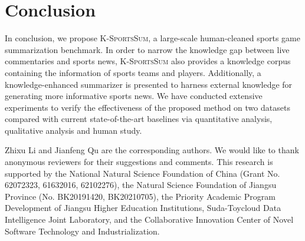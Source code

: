   
  
\section{Conclusion}
In conclusion, we propose \textsc{K-SportsSum}, a large-scale human-cleaned sports game summarization benchmark. In order to narrow the knowledge gap between live commentaries and sports news, \textsc{K-SportsSum} also provides a knowledge corpus containing the information of sports teams and players. Additionally, a  knowledge-enhanced summarizer is presented to harness external knowledge for generating more informative sports news. We have conducted extensive experiments to verify the effectiveness of the proposed method on two datasets compared with current state-of-the-art baselines via quantitative analysis, qualitative analysis and human study.

\begin{acks}
Zhixu Li and Jianfeng Qu are the corresponding authors.
We would like to thank anonymous reviewers for their suggestions and comments. 
This research is supported by the National Natural Science Foundation of China (Grant No. 62072323, 61632016, 62102276), the Natural Science Foundation of Jiangsu Province (No. BK20191420, BK20210705), the Priority Academic Program Development of Jiangsu Higher Education Institutions, Suda-Toycloud Data Intelligence Joint Laboratory, and the Collaborative Innovation Center of Novel Software Technology and Industrialization.
\end{acks}

\clearpage
\balance

